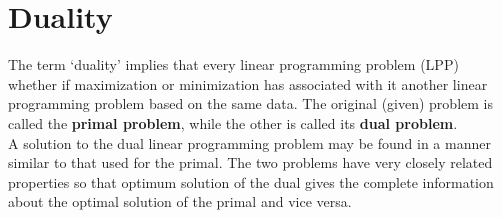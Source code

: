 \documentclass[../main-sheet.tex]{subfiles}
\begin{document}
\chapter{Duality}
The term `duality' implies that every linear programming problem (LPP) whether if maximization or minimization has associated with it another linear programming problem based on the same data. The original (given) problem is called the \textbf{primal problem}, while the other is called its \textbf{dual problem}.\\

A solution to the dual linear programming problem may be found in a manner similar to that used for the primal. The two problems have very closely related properties so that optimum solution of the dual gives the complete information about the optimal solution of the primal and vice versa.
\end{document}
